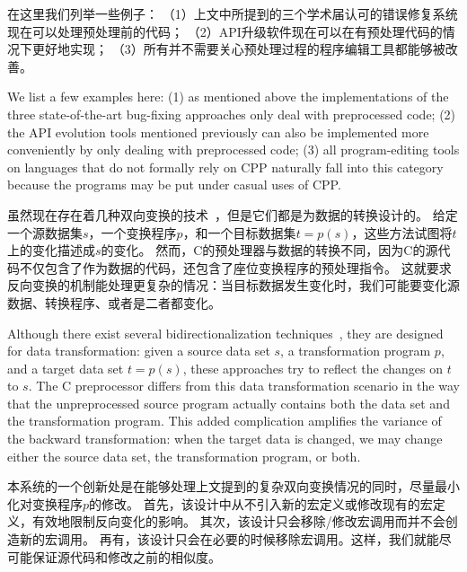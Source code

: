 
在这里我们列举一些例子：
（1）上文中所提到的三个学术届认可的错误修复系统现在可以处理预处理前的代码；
（2）API升级软件现在可以在有预处理代码的情况下更好地实现；
（3）所有并不需要关心预处理过程的程序编辑工具都能够被改善。

We list a few examples here: (1) as mentioned 
above the implementations of the three state-of-the-art
bug-fixing approaches only deal with preprocessed code; (2) the API
evolution tools mentioned previously can also be implemented more
conveniently by only dealing with preprocessed code; (3) all
program-editing tools on languages that do not formally rely on CPP
naturally fall into this category because the programs may be put
under casual uses of CPP.

虽然现在存在着几种双向变换的技术~\parencite{MaHNHT07,Voigtlander09bff,voigtlander2010combining}，但是它们都是为数据的转换设计的。
给定一个源数据集$s$，一个变换程序$p$，和一个目标数据集$t=p(s)$，这些方法试图将$t$上的变化描述成$s$的变化。
然而，C的预处理器与数据的转换不同，因为C的源代码不仅包含了作为数据的代码，还包含了座位变换程序的预处理指令。
这就要求反向变换的机制能处理更复杂的情况：当目标数据发生变化时，我们可能要变化源数据、转换程序、或者是二者都变化。

Although there exist several
bidirectionalization
techniques~\parencite{MaHNHT07,Voigtlander09bff,voigtlander2010combining},
they are designed for data transformation: given a source data set
$s$, a transformation program $p$, and a target data set $t=p(s)$,
these approaches try to reflect the changes on $t$ to $s$. The C
preprocessor differs from this data transformation scenario in the way that the
unpreprocessed source program actually contains both the data set and
the transformation program. This added complication amplifies the variance of the
backward transformation: when the target data is changed, we may
change either the source data set, the transformation program, or
both.

本系统的一个创新处是在能够处理上文提到的复杂双向变换情况的同时，尽量最小化对变换程序$p$的修改。
首先，该设计中从不引入新的宏定义或修改现有的宏定义，有效地限制反向变化的影响。
其次，该设计只会移除/修改宏调用而并不会创造新的宏调用。
再有，该设计只会在必要的时候移除宏调用。这样，我们就能尽可能保证源代码和修改之前的相似度。

